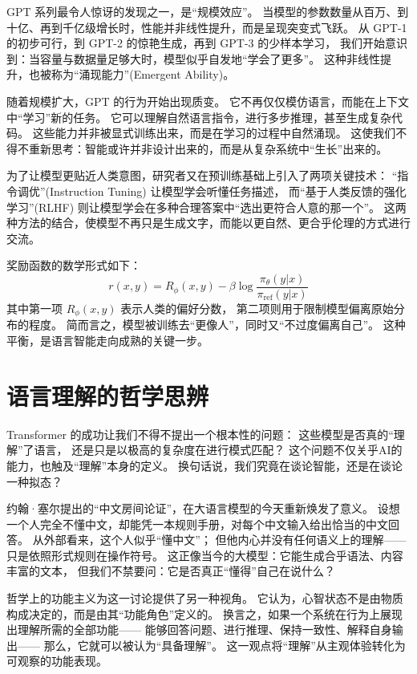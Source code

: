 GPT 系列最令人惊讶的发现之一，是“规模效应”。  
当模型的参数数量从百万、到十亿、再到千亿级增长时，性能并非线性提升，而是呈现突变式飞跃。  
从 GPT-1 的初步可行，到 GPT-2 的惊艳生成，再到 GPT-3 的少样本学习，  
我们开始意识到：当容量与数据量足够大时，模型似乎自发地“学会了更多”。  
这种非线性提升，也被称为“涌现能力”(Emergent Ability)。  

随着规模扩大，GPT 的行为开始出现质变。  
它不再仅仅模仿语言，而能在上下文中“学习”新的任务。  
它可以理解自然语言指令，进行多步推理，甚至生成复杂代码。  
这些能力并非被显式训练出来，而是在学习的过程中自然涌现。  
这使我们不得不重新思考：智能或许并非设计出来的，而是从复杂系统中“生长”出来的。  

为了让模型更贴近人类意图，研究者又在预训练基础上引入了两项关键技术：  
“指令调优”(Instruction Tuning) 让模型学会听懂任务描述，  
而“基于人类反馈的强化学习”(RLHF) 则让模型学会在多种合理答案中“选出更符合人意的那一个”。  
这两种方法的结合，使模型不再只是生成文字，而能以更自然、更合乎伦理的方式进行交流。  

奖励函数的数学形式如下：  
\[
r(x, y) = R_\phi(x, y) - \beta \log \frac{\pi_\theta(y|x)}{\pi_{\text{ref}}(y|x)}
\]  
其中第一项 $R_\phi(x, y)$ 表示人类的偏好分数，  
第二项则用于限制模型偏离原始分布的程度。  
简而言之，模型被训练去“更像人”，同时又“不过度偏离自己”。  
这种平衡，是语言智能走向成熟的关键一步。  

\section{语言理解的哲学思辨}

Transformer 的成功让我们不得不提出一个根本性的问题：  
这些模型是否真的“理解”了语言，  
还是只是以极高的复杂度在进行模式匹配？  
这个问题不仅关乎AI的能力，也触及“理解”本身的定义。  
换句话说，我们究竟在谈论智能，还是在谈论一种拟态？  

约翰·塞尔提出的“中文房间论证”，在大语言模型的今天重新焕发了意义。  
设想一个人完全不懂中文，却能凭一本规则手册，对每个中文输入给出恰当的中文回答。  
从外部看来，这个人似乎“懂中文”；  
但他内心并没有任何语义上的理解——只是依照形式规则在操作符号。  
这正像当今的大模型：它能生成合乎语法、内容丰富的文本，  
但我们不禁要问：它是否真正“懂得”自己在说什么？  

哲学上的功能主义为这一讨论提供了另一种视角。  
它认为，心智状态不是由物质构成决定的，而是由其“功能角色”定义的。  
换言之，如果一个系统在行为上展现出理解所需的全部功能——  
能够回答问题、进行推理、保持一致性、解释自身输出——  
那么，它就可以被认为“具备理解”。  
这一观点将“理解”从主观体验转化为可观察的功能表现。  

